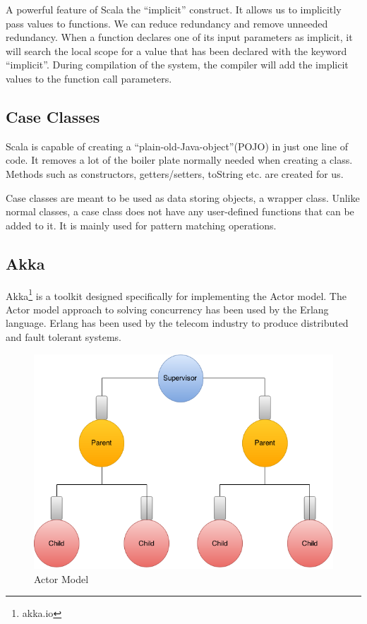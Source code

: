 A powerful feature of Scala the ``implicit'' construct. It allows us to implicitly pass values to functions. We can reduce redundancy and remove unneeded redundancy. When a function declares one of its input parameters as implicit, it will search the local scope for a value that has been declared with the keyword ``implicit''. During compilation of the system, the compiler will add the implicit values to the function call parameters.

\subsection{Case Classes}
Scala is capable of creating a ``plain-old-Java-object''(POJO) in just one line of code. It removes a lot of the boiler plate normally needed when creating a class. Methods such as constructors, getters/setters, toString etc. are created for us.

Case classes are meant to be used as data storing objects, a wrapper class. Unlike normal classes, a case class does not have any user-defined functions that can be added to it. It is mainly used for pattern matching operations.

\subsection{Akka} 
Akka\footnote{akka.io}\cite{akka-documentation} is a toolkit designed specifically for implementing the Actor model. The Actor model approach to solving concurrency has been used by the Erlang language. Erlang has been used by the telecom industry to produce distributed and fault tolerant systems. 

\begin{figure}[h]
	\centering
	\includegraphics[scale=0.4]{images/tools/ActorModel.png} 
	\caption{Actor Model}
	\label{fig:ActorModel}
\end{figure}

